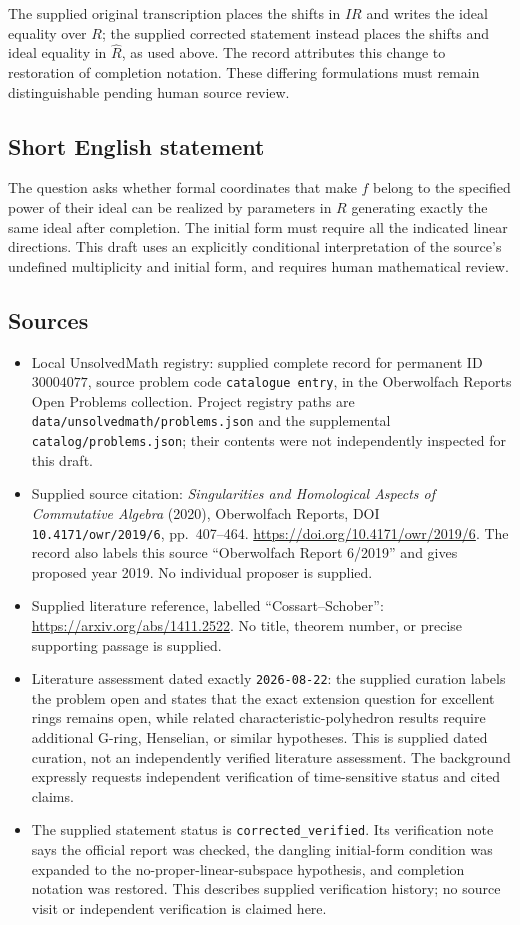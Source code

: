 \documentclass[11pt]{article}
\begin{document}
The supplied original transcription places the shifts in \(IR\) and writes the ideal equality over \(R\); the supplied corrected statement instead places the shifts and ideal equality in \(\widehat R\), as used above. The record attributes this change to restoration of completion notation. These differing formulations must remain distinguishable pending human source review.
\subsection{Short English statement}
The question asks whether formal coordinates that make \(f\) belong to the specified power of their ideal can be realized by parameters in \(R\) generating exactly the same ideal after completion. The initial form must require all the indicated linear directions. This draft uses an explicitly conditional interpretation of the source's undefined multiplicity and initial form, and requires human mathematical review.
\subsection{Sources}
\begin{itemize}
\item Local UnsolvedMath registry: supplied complete record for permanent ID \(30004077\), source problem code \texttt{catalogue entry}, in the Oberwolfach Reports Open Problems collection. Project registry paths are \texttt{data/unsolvedmath/problems.json} and the supplemental \texttt{catalog/problems.json}; their contents were not independently inspected for this draft.
\item Supplied source citation: \emph{Singularities and Homological Aspects of Commutative Algebra} (2020), Oberwolfach Reports, DOI \texttt{10.4171/owr/2019/6}, pp.\ 407--464. \url{https://doi.org/10.4171/owr/2019/6}. The record also labels this source ``Oberwolfach Report 6/2019'' and gives proposed year 2019. No individual proposer is supplied.
\item Supplied literature reference, labelled ``Cossart--Schober'': \url{https://arxiv.org/abs/1411.2522}. No title, theorem number, or precise supporting passage is supplied.
\item Literature assessment dated exactly \texttt{2026-08-22}: the supplied curation labels the problem open and states that the exact extension question for excellent rings remains open, while related characteristic-polyhedron results require additional G-ring, Henselian, or similar hypotheses. This is supplied dated curation, not an independently verified literature assessment. The background expressly requests independent verification of time-sensitive status and cited claims.
\item The supplied statement status is \texttt{corrected\_verified}. Its verification note says the official report was checked, the dangling initial-form condition was expanded to the no-proper-linear-subspace hypothesis, and completion notation was restored. This describes supplied verification history; no source visit or independent verification is claimed here.
\end{itemize}
\end{document}
